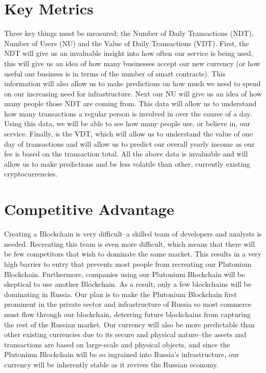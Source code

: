 \documentclass[12pt]{article}
\begin{document}
\pagebreak
\section{Key Metrics}
Three key things must be measured; the Number of Daily Transactions (NDT), Number of
Users (NU) and the Value of Daily Transactions (VDT). First, the NDT will give us an
invaluable insight into how often our service is being used, this will give us an idea of how
many businesses accept our new currency (or how useful our business is in terms of the
number of smart contracts). This information will also allow us to make predictions on how
much we need to spend on our increasing need for infrastructure. Next our NU will give us
an idea of how many people those NDT are coming from. This data will allow us to
understand how many transactions a regular person is involved in over the course of a day.
Using this data, we will be able to see how many people use, or believe in, our service.
Finally, is the VDT, which will allow us to understand the value of one day of transactions
and will allow us to predict our overall yearly income as our fee is based on the transaction
total. All the above data is invaluable and will allow us to make predictions and be less
volatile than other, currently existing cryptocurrencies. 
\pagebreak
\section{Competitive Advantage}
Creating a Blockchain is very difficult--a skilled team of developers and analysts is needed. Recreating this team is even more difficult, which means that there will be few competitors that wish to dominate the same market. This results in a very high barrier to entry that prevents most people from recreating our Plutonium Blockchain. Furthermore, companies using our Plutonium Blockchain will be skeptical to use another Blockchain. As a result, only a few blockchains will be dominating in Russia. Our plan is to make the Plutonium Blockchain first prominent in the private sector and infrastructure of Russia so most commerce must flow through our blockchain, deterring future blockchains from capturing the rest of the Russian market. Our currency will also be more predictable than other existing currencies due to its secure and physical nature--the assets and transactions are based on large-scale and physical objects, and since the Plutonium Blockchain will be so ingrained into Russia's infrastructure, our currency will be inherently stable as it revives the Russian economy.
\pagebreak
\end{document}
